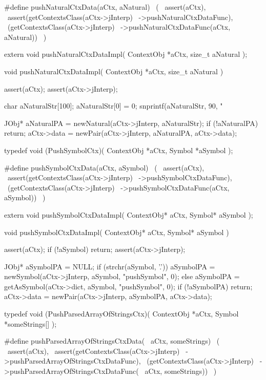 #define pushNaturalCtxData(aCtx, aNatural)      \
  (                                             \
    assert(aCtx),                               \
    assert(getContextsClass(aCtx->jInterp)      \
      ->pushNaturalCtxDataFunc),                \
    (getContextsClass(aCtx->jInterp)            \
      ->pushNaturalCtxDataFunc(aCtx, aNatural)) \
  )
\stopCHeader

\setCHeaderStream{private}
\startCHeader
extern void pushNaturalCtxDataImpl(
  ContextObj *aCtx,
  size_t      aNatural
);
\stopCHeader
\setCHeaderStream{public}

\startCCode
void pushNaturalCtxDataImpl(
  ContextObj *aCtx,
  size_t      aNatural
) {
  assert(aCtx);
  assert(aCtx->jInterp);

  char aNaturalStr[100];
  aNaturalStr[0] = 0;
  snprintf(aNaturalStr, 90, "%

  JObj* aNaturalPA = newNatural(aCtx->jInterp, aNaturalStr);
  if (!aNaturalPA) return;
  aCtx->data = newPair(aCtx->jInterp, aNaturalPA, aCtx->data);
}
\stopCCode

\startCHeader
typedef void (PushSymbolCtx)(
  ContextObj *aCtx,
  Symbol     *aSymbol
);

#define pushSymbolCtxData(aCtx, aSymbol)      \
  (                                           \
    assert(aCtx),                             \
    assert(getContextsClass(aCtx->jInterp)    \
      ->pushSymbolCtxDataFunc),               \
    (getContextsClass(aCtx->jInterp)          \
      ->pushSymbolCtxDataFunc(aCtx, aSymbol)) \
  )
\stopCHeader

\startCHeader
extern void pushSymbolCtxDataImpl(
  ContextObj* aCtx,
  Symbol* aSymbol
);
\stopCHeader
\setCHeaderStream{public}

\startCCode
void pushSymbolCtxDataImpl(
  ContextObj* aCtx,
  Symbol* aSymbol
) {
  assert(aCtx);
  if (!aSymbol) return;
  assert(aCtx->jInterp);

  JObj* aSymbolPA = NULL;
  if (strchr(aSymbol, '.')) {
    aSymbolPA =
      newSymbol(aCtx->jInterp, aSymbol, "pushSymbol", 0);
  } else {
    aSymbolPA = getAsSymbol(aCtx->dict, aSymbol, "pushSymbol", 0);
  }
  if (!aSymbolPA) return;
  aCtx->data = newPair(aCtx->jInterp, aSymbolPA, aCtx->data);
}
\stopCCode

\startCHeader
typedef void (PushParsedArrayOfStringsCtx)(
  ContextObj *aCtx,
  Symbol     *someStrings[]
);

#define pushParsedArrayOfStringsCtxData(      \
  aCtx, someStrings)                          \
  (                                           \
    assert(aCtx),                             \
    assert(getContextsClass(aCtx->jInterp)    \
      ->pushParsedArrayOfStringsCtxDataFunc), \
    (getContextsClass(aCtx->jInterp)          \
      ->pushParsedArrayOfStringsCtxDataFunc(  \
        aCtx, someStrings))                   \
  )
\stopCHeader

